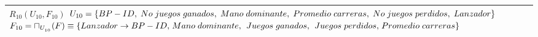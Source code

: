 \documentclass{report}
\begin{document}
\begin{tabularx}{\textwidth}{|X|}
        $ R_{10} ( U_{10} , F_{10} ) $ \newline 
        $ U_{10} = \{{BP-ID, \hspace{0.1cm}  No \hspace{0.1cm} juegos \hspace{0.1cm} ganados, \hspace{0.1cm}  Mano \hspace{0.1cm} dominante, \hspace{0.1cm}  Promedio \hspace{0.1cm} carreras, \hspace{0.1cm}  No \hspace{0.1cm} juegos \hspace{0.1cm} perdidos, \hspace{0.1cm}  Lanzador}\} $ \newline 
        $ F_{10} = \sqcap_{U_{_{10}}}(F) \equiv \{Lanzador \rightarrow BP-ID, \hspace{0.05cm} Mano \hspace{0.1cm} dominante, \hspace{0.05cm} \hspace{0.1cm} Juegos \hspace{0.1cm} ganados, \hspace{0.05cm} \hspace{0.1cm} Juegos \hspace{0.1cm} perdidos, \hspace{0.05cm} Promedio \hspace{0.1cm} carreras \} $\newline \\
                       
        \bottomrule
    \end{tabularx}
\end{document}
